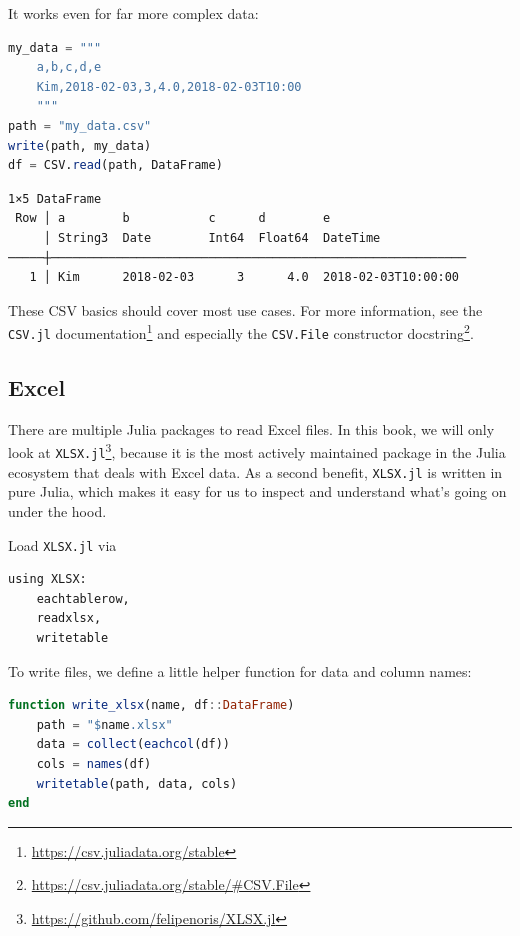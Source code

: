 \documentclass[
  notoc %
]{tufte-book}
\DeclareRobustCommand{\href}[2]{#2\footnote{\url{#1}}}
\newcommand{\passthrough}[1]{#1}
\begin{document}
It works even for far more complex data:

\begin{lstlisting}[language=Julia]
my_data = """
    a,b,c,d,e
    Kim,2018-02-03,3,4.0,2018-02-03T10:00
    """
path = "my_data.csv"
write(path, my_data)
df = CSV.read(path, DataFrame)
\end{lstlisting}

\begin{lstlisting}[language=Output]
1×5 DataFrame
 Row │ a        b           c      d        e
     │ String3  Date        Int64  Float64  DateTime
─────┼──────────────────────────────────────────────────────────
   1 │ Kim      2018-02-03      3      4.0  2018-02-03T10:00:00
\end{lstlisting}

These CSV basics should cover most use cases. For more information, see
the
\href{https://csv.juliadata.org/stable}{\passthrough{\lstinline!CSV.jl!}
documentation} and especially the
\href{https://csv.juliadata.org/stable/\#CSV.File}{\passthrough{\lstinline!CSV.File!}
constructor docstring}.

\hypertarget{sec:excel}{%
\subsection{Excel}\label{sec:excel}}

There are multiple Julia packages to read Excel files. In this book, we
will only look at
\href{https://github.com/felipenoris/XLSX.jl}{\passthrough{\lstinline!XLSX.jl!}},
because it is the most actively maintained package in the Julia
ecosystem that deals with Excel data. As a second benefit,
\passthrough{\lstinline!XLSX.jl!} is written in pure Julia, which makes
it easy for us to inspect and understand what's going on under the hood.

Load \passthrough{\lstinline!XLSX.jl!} via

\begin{lstlisting}
using XLSX:
    eachtablerow,
    readxlsx,
    writetable
\end{lstlisting}

To write files, we define a little helper function for data and column
names:

\begin{lstlisting}[language=Julia]
function write_xlsx(name, df::DataFrame)
    path = "$name.xlsx"
    data = collect(eachcol(df))
    cols = names(df)
    writetable(path, data, cols)
end
\end{lstlisting}
\end{document}
